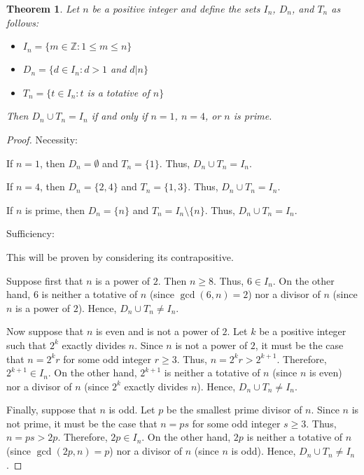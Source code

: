 \documentclass[12pt]{article}
\newtheorem{thm*}{Theorem}
\begin{document}
\begin{thm*}
Let $n$ be a positive integer and define the sets $I_n$, $D_n$, and $T_n$ as follows:

\begin{itemize}
\item $I_n=\{ m \in \mathbb{Z}: 1 \le m \le n \}$
\item $D_n=\{ d \in I_n: d>1$ and $d|n \}$
\item $T_n=\{ t \in I_n: t$ is a totative of $n \}$
\end{itemize}

Then $D_n \cup T_n=I_n$ if and only if $n=1$, $n=4$, or $n$ is prime.
\end{thm*}

\begin{proof}

\vspace{2mm}

Necessity:

If $n=1$, then $D_n=\emptyset$ and $T_n=\{1\}$.  Thus, $D_n \cup T_n=I_n$.

If $n=4$, then $D_n=\{2,4\}$ and $T_n=\{1,3\}$.  Thus, $D_n \cup T_n=I_n$.

If $n$ is prime, then $D_n=\{ n \}$ and $T_n=I_n \setminus \{ n \}$.  Thus, $D_n \cup T_n=I_n$.

Sufficiency:

This will be proven by considering its contrapositive.

Suppose first that $n$ is a power of $2$.  Then $n \ge 8$.  Thus, $6 \in I_n$.  On the other hand, $6$ is neither a totative of $n$ (since $\gcd(6,n)=2$) nor a divisor of $n$ (since $n$ is a power of $2$).  Hence, $D_n \cup T_n \neq I_n$.

Now suppose that $n$ is even and is not a power of $2$.  Let $k$ be a positive integer such that $2^k$ exactly divides $n$.  Since $n$ is not a power of $2$, it must be the case that $n=2^kr$ for some odd integer $r \ge 3$.  Thus, $n=2^kr>2^{k+1}$.  Therefore, $2^{k+1} \in I_n$.  On the other hand, $2^{k+1}$ is neither a totative of $n$ (since $n$ is even) nor a divisor of $n$ (since $2^k$ exactly divides $n$).  Hence, $D_n \cup T_n \neq I_n$.

Finally, suppose that $n$ is odd.  Let $p$ be the smallest prime divisor of $n$.  Since $n$ is not prime, it must be the case that $n=ps$ for some odd integer $s \ge 3$.  Thus, $n=ps>2p$.  Therefore, $2p \in I_n$.  On the other hand, $2p$ is neither a totative of $n$ (since $\gcd(2p,n)=p$) nor a divisor of $n$ (since $n$ is odd).  Hence, $D_n \cup T_n \neq I_n$.
\end{proof}
\end{document}
